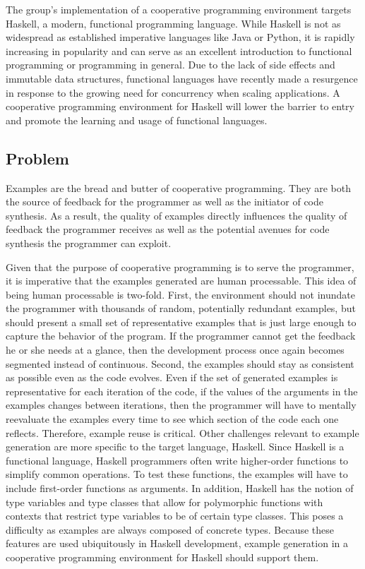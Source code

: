 The group's implementation of a cooperative programming environment targets Haskell, a modern, functional programming language.
While Haskell is not as widespread as established imperative languages like Java or Python, it is rapidly increasing in popularity and can serve as an excellent introduction to functional programming or programming in general.
Due to the lack of side effects and immutable data structures, functional languages have recently made a resurgence in response to the growing need for concurrency when scaling applications.
A cooperative programming environment for Haskell will lower the barrier to entry and promote the learning and usage of functional languages.


\subsection{Problem}

Examples are the bread and butter of cooperative programming.
They are both the source of feedback for the programmer as well as the initiator of code synthesis.
As a result, the quality of examples directly influences the quality of feedback the programmer receives as well as the potential avenues for code synthesis the programmer can exploit.

Given that the purpose of cooperative programming is to serve the programmer, it is imperative that the examples generated are human processable.
This idea of being human processable is two-fold.
First, the environment should not inundate the programmer with thousands of random, potentially redundant examples, but should present a small set of representative examples that is just large enough to capture the behavior of the program.
If the programmer cannot get the feedback he or she needs at a glance, then the development process once again becomes segmented instead of continuous.
Second, the examples should stay as consistent as possible even as the code evolves.
Even if the set of generated examples is representative for each iteration of the code, if the values of the arguments in the examples changes between iterations, then the programmer will have to mentally reevaluate the examples every time to see which section of the code each one reflects.
Therefore, example reuse is critical.
Other challenges relevant to example generation are more specific to the target language, Haskell.
Since Haskell is a functional language, Haskell programmers often write higher-order functions to simplify common operations.
To test these functions, the examples will have to include first-order functions as arguments.
In addition, Haskell has the notion of type variables and type classes that allow for polymorphic functions with contexts that restrict type variables to be of certain type classes.
This poses a difficulty as examples are always composed of concrete types.
Because these features are used ubiquitously in Haskell development, example generation in a cooperative programming environment for Haskell should support them.


